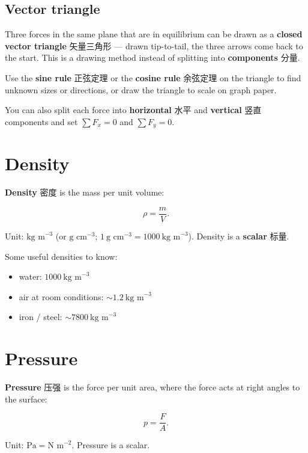 \documentclass[11pt]{article}
\begin{document}
\subsection*{Vector triangle}

Three forces in the same plane that are in equilibrium can be drawn as a \textbf{closed vector triangle} 矢量三角形 — drawn tip-to-tail, the three arrows come back to the start. This is a drawing method instead of splitting into \textbf{components} 分量.

Use the \textbf{sine rule} 正弦定理 or the \textbf{cosine rule} 余弦定理 on the triangle to find unknown sizes or directions, or draw the triangle to scale on graph paper.

You can also split each force into \textbf{horizontal} 水平 and \textbf{vertical} 竖直 components and set $\sum F_{x} = 0$ and $\sum F_{y} = 0$.

\section*{Density}

\textbf{Density} 密度 is the mass per unit volume:

\[
\rho = \frac{m}{V}.
\]

Unit: $\text{kg m}^{-3}$ (or $\text{g cm}^{-3}$; $1\ \text{g cm}^{-3} = 1000\ \text{kg m}^{-3}$). Density is a \textbf{scalar} 标量.

Some useful densities to know:

\begin{itemize}
\item water: $1000\ \text{kg m}^{-3}$

\item air at room conditions: $\sim 1.2\ \text{kg m}^{-3}$

\item iron / steel: $\sim 7800\ \text{kg m}^{-3}$

\end{itemize}

\section*{Pressure}

\textbf{Pressure} 压强 is the force per unit area, where the force acts at right angles to the surface:

\[
p = \frac{F}{A}.
\]

Unit: $\text{Pa} = \text{N m}^{-2}$. Pressure is a scalar.
\end{document}
